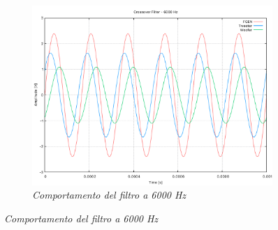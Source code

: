 \documentclass[12pt]{article}
\begin{document}
\begin{figure}[!ht]
\begin{subfigure}{.5\textwidth}
    \centering
    \includegraphics[width=1\linewidth]{../results/CF6000Hz.pdf}
    \caption{\textit{Comportamento del filtro a 6000 Hz}}
  \end{subfigure}%


\end{figure}
\end{document}
